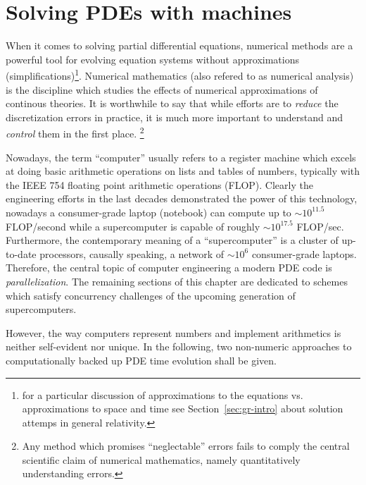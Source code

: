 \section{Solving PDEs with machines}\label{sec:solving-pdes-computers}
When it comes to solving partial differential equations, numerical methods are a
powerful tool for evolving equation systems without approximations
(simplifications)\footnote{for a particular discussion of approximations to
	the equations vs. approximations to space and time
	see Section~\vref{sec:gr-intro} about solution attemps in general 
	relativity.}.
Numerical mathematics (also refered to as numerical analysis) is the discipline
which studies the effects of numerical approximations of continous theories. It
is worthwhile to say that while efforts are to \emph{reduce}
the discretization errors in practice, it is much more
important to understand and \emph{control} them in the first place.
\footnote{Any method
which promises ``neglectable'' errors fails to comply the central
scientific claim of numerical mathematics, namely quantitatively understanding
errors.}


Nowadays, the term ``computer'' usually refers to a register machine which
excels at doing basic arithmetic operations on lists and tables of numbers,
typically with the IEEE 754 floating point arithmetic operations (FLOP). Clearly
the engineering efforts in the last decades demonstrated the power of this
technology, nowadays a consumer-grade laptop (notebook)
can compute up to $\sim 10^{11.5}$
FLOP/second while a supercomputer is capable of roughly $\sim 10^{17.5}$
FLOP/sec. Furthermore, the contemporary meaning of a ``supercomputer'' is a
cluster of up-to-date processors, \ie causally speaking, a network of $\sim
10^6$ consumer-grade laptops. Therefore, the central topic of computer
engineering a modern PDE code is \emph{parallelization}. The remaining sections
of this chapter are dedicated to schemes which satisfy concurrency challenges of
the upcoming generation of supercomputers.

However, the way computers represent numbers and implement arithmetics is neither
self-evident nor unique. In the following, two non-numeric approaches to
computationally backed up PDE time evolution shall be given.

